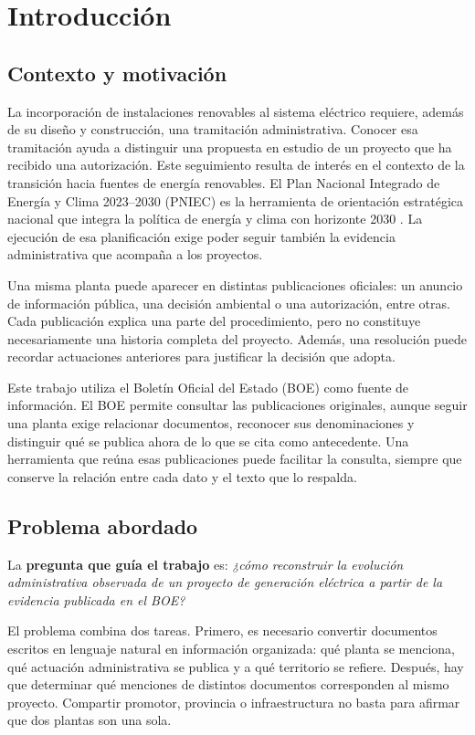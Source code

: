 \chapter{Introducción}
\label{ch:introduccion}

\section{Contexto y motivación}
La incorporación de instalaciones renovables al sistema eléctrico requiere,
además de su diseño y construcción, una tramitación administrativa. Conocer
esa tramitación ayuda a distinguir una propuesta en estudio de un proyecto
que ha recibido una autorización. Este seguimiento resulta de interés en el
contexto de la transición hacia fuentes de energía renovables. El
Plan Nacional Integrado de Energía y Clima 2023--2030 (PNIEC) es la herramienta
de orientación estratégica nacional que integra la política de energía y clima
con horizonte 2030 \cite{miteco_pniec_2023_2030_2024}. La ejecución de esa
planificación exige poder seguir también la evidencia administrativa que
acompaña a los proyectos.

Una misma planta puede aparecer en distintas publicaciones oficiales: un
anuncio de información pública, una decisión ambiental o una autorización,
entre otras. Cada publicación explica una parte del procedimiento, pero no
constituye necesariamente una historia completa del proyecto. Además, una
resolución puede recordar actuaciones anteriores para justificar la decisión
que adopta.

Este trabajo utiliza el Boletín Oficial del Estado (BOE) como fuente de
información. El BOE permite consultar las publicaciones originales, aunque
seguir una planta exige relacionar documentos, reconocer sus denominaciones
y distinguir qué se publica ahora de lo que se cita como antecedente. Una
herramienta que reúna esas publicaciones puede facilitar la consulta, siempre
que conserve la relación entre cada dato y el texto que lo respalda.

\section{Problema abordado}
La \textbf{pregunta que guía el trabajo} es: \emph{¿cómo reconstruir la evolución
administrativa observada de un proyecto de generación eléctrica a partir de
la evidencia publicada en el BOE?}

El problema combina dos tareas. Primero, es necesario convertir documentos
escritos en lenguaje natural en información organizada: qué planta se
menciona, qué actuación administrativa se publica y a qué territorio se
refiere. Después, hay que determinar qué menciones de distintos documentos
corresponden al mismo proyecto. Compartir promotor, provincia o
infraestructura no basta para afirmar que dos plantas son una sola.

